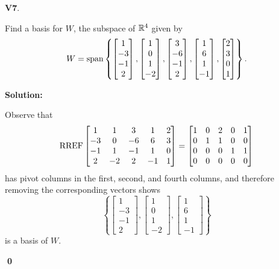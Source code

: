 \documentclass{article}
\newenvironment{problem}[1]
{
  \begin{flushleft}
  \textbf{#1}.
  \ignorespaces
}
{
  \end{flushleft}
}
\newenvironment{solution}
{
  \ignorespaces
  \textbf{Solution:}
}
{
  \ignorespacesafterend
  \begin{flushright}
  {\bfseries \qed}
  \end{flushright}
}
\begin{document}
\begin{problem}{V7}
Find a basis for \(W\), the subspace of \(\mathbb{R}^4\) given by
\[
  W = \operatorname{span} \left\{
  \begin{bmatrix} 1 \\ -3 \\ -1 \\ 2 \end{bmatrix} ,
  \begin{bmatrix} 1 \\ 0 \\ 1 \\ -2 \end{bmatrix} ,
  \begin{bmatrix} 3 \\ -6 \\ -1 \\ 2 \end{bmatrix} ,
  \begin{bmatrix} 1 \\ 6 \\ 1 \\ -1 \end{bmatrix} ,
  \begin{bmatrix} 2 \\ 3 \\ 0 \\ 1 \end{bmatrix}
  \right\} .
\]
\end{problem}
\begin{solution}
Observe that
\[ \operatorname{RREF}
    \begin{bmatrix}
    1 & 1 & 3 & 1 & 2 \\
    -3 & 0 & -6 & 6 & 3 \\
    -1 & 1 & -1 & 1 & 0 \\
    2 & -2 & 2 & -1 & 1
    \end{bmatrix} =
    \begin{bmatrix}
    1 & 0 & 2 & 0 & 1 \\
    0 & 1 & 1 & 0 & 0 \\
    0 & 0 & 0 & 1 & 1 \\
    0 & 0 & 0 & 0 & 0
    \end{bmatrix}
\]
has pivot columns in the first, second, and fourth columns, and therefore removing the corresponding vectors shows
\[\left\{
  \begin{bmatrix} 1 \\ -3 \\ -1 \\ 2 \end{bmatrix} ,
  \begin{bmatrix} 1 \\ 0 \\ 1 \\ -2 \end{bmatrix} ,
  \begin{bmatrix} 1 \\ 6 \\ 1 \\ -1 \end{bmatrix}
  \right\}
\]
is a basis of \(W\).
\end{solution}
\end{document}
